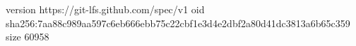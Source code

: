 version https://git-lfs.github.com/spec/v1
oid sha256:7aa88c989aa597c6eb666ebb75c22cbf1e3d4e2dbf2a80d41dc3813a6b65c359
size 60958
